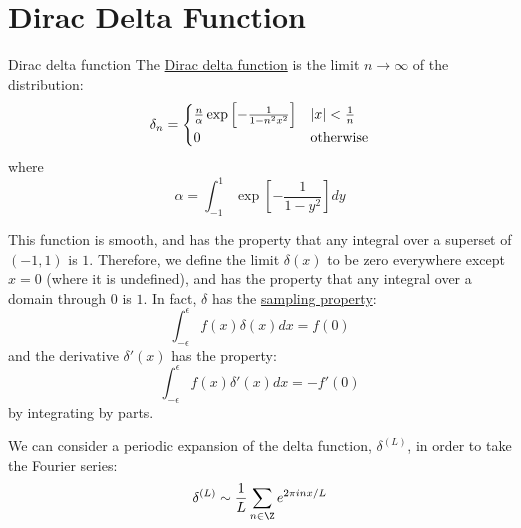 \documentclass[../Main.tex]{subfiles}
\begin{document}
\section{Dirac Delta Function}
\begin{definition}{Dirac delta function}
    The \underline{Dirac delta function} is the limit $n \to \infty$ of the distribution:
    \begin{equation*}
        \delta_n =
        \begin{cases}
            \frac{n}{\alpha} \exp \left[-\frac{1}{1-n^2x^2}\right] & \lvert x\rvert < \frac1n \\
            0 & \text{otherwise}
        \end{cases}
    \end{equation*}
    where
    \begin{equation*}
        \alpha = \int_{-1}^{1} \exp\left[-\frac{1}{1-y^2}\right] dy 
    \end{equation*}
\end{definition}
This function is smooth, and has the property that any integral over a superset of $(-1, 1)$ is $1$. Therefore, we define the limit $\delta(x)$ to be zero everywhere except $x = 0$ (where it is undefined), and has the property that any integral over a domain through $0$ is $1$. In fact, $\delta$ has the \underline{sampling property}:
\begin{equation*}
    \int_{-\epsilon}^{\epsilon} f(x)\delta(x) dx = f(0)
\end{equation*}
and the derivative $\delta'(x)$ has the property:
\begin{equation*}
    \int_{-\epsilon}^{\epsilon} f(x)\delta'(x) dx = -f'(0)
\end{equation*}
by integrating by parts.

We can consider a periodic expansion of the delta function, $\delta^{(L)}$, in order to take the Fourier series:
\begin{equation*}
    \delta^{(L)} \sim \frac1L \sum_{n \in \Z} e^{2 \pi i n x / L}
\end{equation*}
\end{document}
